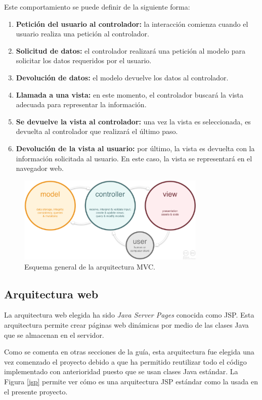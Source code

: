 Este comportamiento se puede definir de la siguiente forma:

\begin{enumerate}
	\item \textbf{Petición del usuario al controlador:} la interacción comienza cuando el usuario realiza una petición al controlador.
	\item \textbf{Solicitud de datos:} el controlador realizará una petición al modelo para solicitar los datos requeridos por el usuario.
	\item \textbf{Devolución de datos:} el modelo devuelve los datos al controlador.
	\item \textbf{Llamada a una vista:} en este momento, el controlador buscará la vista adecuada para representar la información.
	\item \textbf{Se devuelve la vista al controlador:} una vez la vista es seleccionada, es devuelta al controlador que realizará el último paso.
	\item \textbf{Devolución de la vista al usuario:} por último, la vista es devuelta con la información solicitada al usuario. En este caso, la vista se representará en el navegador web.
\end{enumerate}

\begin{figure}[!htbp]
  \centering
    \includegraphics[width=0.8\textwidth]{../img/mvc/mvc.png}
  \caption{Esquema general de la arquitectura MVC.}
  \label{mvc}
\end{figure}

\subsection{Arquitectura web}
La arquitectura web elegida ha sido \textit{Java Server Pages} conocida como JSP. Esta arquitectura permite crear páginas web dinámicas por medio de las clases Java que se almacenan en el servidor.

Como se comenta en otras secciones de la guía, esta arquitectura fue elegida una vez comenzado el proyecto debido a que ha permitido reutilizar todo el código implementado con anterioridad puesto que se usan clases Java estándar. La Figura  \ref{jsp} permite ver cómo es una arquitectura JSP estándar como la usada en el presente proyecto.

